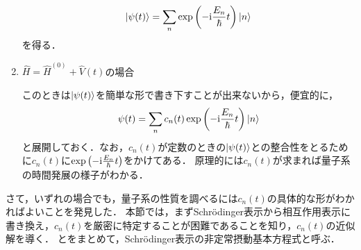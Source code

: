 \documentclass{report}
\begin{document}
\begin{enumerate}
\begin{align}
        \ket{\psi(t)} = \sum_{n}\exp\qty(-\mathrm{i}\frac{E_n}{\hbar}t)\ket{n}
      \end{align}
      を得る．
    \item $\hat{H} = \hat{H}^{(0)} + \hat{V}(t)$の場合\par
      このときは$\ket{\psi(t)}$を簡単な形で書き下すことが出来ないから，便宜的に，
      \begin{align}
        \psi(t) = \sum_{n}c_n(t)\exp\qty(-\mathrm{i}\frac{E_n}{\hbar}t)\ket{n}\label{nonsteady-perturbation-cnt-eq}
      \end{align}
      と展開しておく．なお，$c_n(t)$が定数のときの$\ket{\psi(t)}$との整合性をとるために$c_n(t)$に$\exp\qty(-\mathrm{i}\frac{E_n}{\hbar}t)$をかけてある．
      原理的には$c_n(t)$が求まれば量子系の時間発展の様子がわかる．%
  \end{enumerate}
  \par
  さて，いずれの場合でも，量子系の性質を調べるには$c_n(t)$の具体的な形がわかればよいことを発見した．
  本節では，まずSchr\"odinger表示から相互作用表示に書き換え，$c_n(t)$を厳密に特定することが困難であることを知り，$c_n(t)$の近似解を導く．
  とをまとめて，Schr\"odinger表示の非定常摂動基本方程式と呼ぶ．
\end{document}
